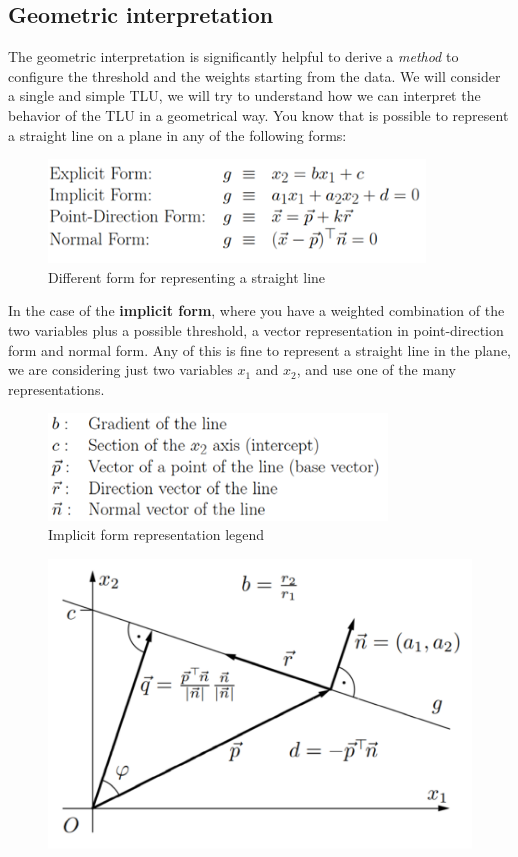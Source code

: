 \documentclass{article}
\begin{document}
\subsection{Geometric interpretation}
The geometric interpretation is significantly helpful to derive a \textit{method} to
configure the threshold and the weights starting from the data. We will consider a
single and simple TLU, we will try to understand how we can interpret the
behavior of the TLU in a geometrical way.
\newline\newline
You know that is possible to represent a straight line on a plane in any of
the following forms:
\begin{figure}[H]
    \centering
    \includegraphics[width=10cm]{images/geom_interp.png}
    \caption{Different form for representing a straight line}
    \label{fig:line_repr}
\end{figure}
In the case of the \textbf{implicit form}, where you have a weighted combination of the two variables plus a
possible threshold, a vector representation in point-direction form and normal form.
Any of this is fine to represent a straight line in the plane, we are considering just
two variables $x_1$ and $x_2$, and use one of the many representations.
\begin{figure}[H]
    \centering
    \includegraphics[width=9cm]{images/geom_interp_impl.png}
    \caption{Implicit form representation legend}
    \label{fig:line_impl_form_legend}
\end{figure}
\begin{figure}[H]
    \centering
    \includegraphics[scale=0.6]{images/geom1.png}
    \label{fig:geom_1}
\end{figure}
\end{document}
